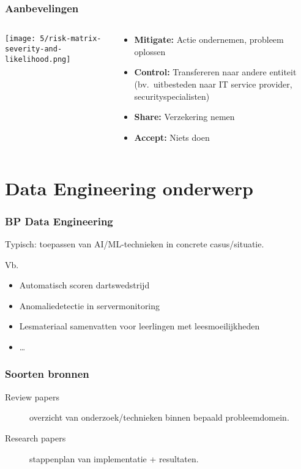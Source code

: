 \documentclass[aspectratio=169]{beamer}
\begin{document}
\begin{frame}
  \frametitle{Aanbevelingen}

  \begin{columns}
    \begin{column}{.5\textwidth}
      \texttt{[image: 5/risk-matrix-severity-and-likelihood.png]}
    \end{column}

    \begin{column}{.5\textwidth}
      \begin{itemize}
        \item \textbf{Mitigate:} Actie ondernemen, probleem oplossen
        \item \textbf{Control:} Transfereren naar andere entiteit (bv.\ uitbesteden naar IT service provider, securityspecialisten)
        \item \textbf{Share:} Verzekering nemen
        \item \textbf{Accept:} Niets doen
      \end{itemize}
    \end{column}
  \end{columns}

\end{frame}

\section{Data Engineering onderwerp}

\begin{frame}
  \frametitle{BP Data Engineering}

  Typisch: toepassen van AI/ML-technieken in concrete casus/situatie.

  Vb.

  \begin{itemize}
    \item Automatisch scoren dartswedstrijd
    \item Anomaliedetectie in servermonitoring
    \item Lesmateriaal samenvatten voor leerlingen met leesmoeilijkheden
    \item \ldots
  \end{itemize}

\end{frame}

\begin{frame}
  \frametitle{Soorten bronnen}

  \begin{description}
    \item[Review papers] overzicht van onderzoek/technieken binnen bepaald probleemdomein.
    \item[Research papers] stappenplan van implementatie + resultaten.
  \end{description}

\end{frame}
\end{document}
